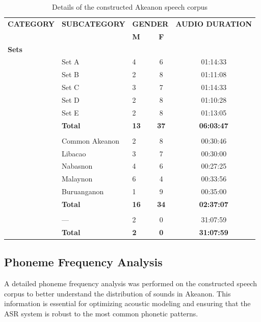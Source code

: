 \begin{table}[H]
	\centering
	\begin{adjustbox}{width=0.95\textwidth}
		\begin{tabular}{lllcc}
			\toprule
			\textbf{CATEGORY} & \textbf{SUBCATEGORY} & \multicolumn{2}{c}{\textbf{GENDER}} & \textbf{AUDIO DURATION} \\
			\cmidrule(lr){3-4}
			& & \textbf{M} & \textbf{F} & \\
			\midrule
			\multicolumn{5}{l}{\textbf{Sets}} \\
			& Set A & 4 & 6 & 01:14:33 \\
			& Set B & 2 & 8 & 01:11:08 \\
			& Set C & 3 & 7 & 01:14:33 \\
			& Set D & 2 & 8 & 01:10:28 \\
			& Set E & 2 & 8 & 01:13:05 \\
			\addlinespace
			& \textbf{Total} & \textbf{13} & \textbf{37} & \textbf{06:03:47} \\
			\addlinespace
			\multicolumn{5}{l}{\textbf{Dialects}} \\
			& Common Akeanon & 2 & 8 & 00:30:46 \\
			& Libacao          & 3 & 7 & 00:30:00 \\
			& Nabasnon         & 4 & 6 & 00:27:25 \\
			& Malaynon         & 6 & 4 & 00:33:56 \\
			& Buruanganon      & 1 & 9 & 00:35:00 \\
			\addlinespace
			& \textbf{Total} & \textbf{16} & \textbf{34} & \textbf{02:37:07} \\
			\addlinespace
			\multicolumn{5}{l}{\textbf{Bible}} \\
			& — & 2 & 0 & 31:07:59 \\
			\addlinespace
			& \textbf{Total} & \textbf{2} & \textbf{0} & \textbf{31:07:59} \\
			\bottomrule
		\end{tabular}
	\end{adjustbox}
	\caption{Details of the constructed Akeanon speech corpus}
	\label{tab:bikolano_stats}
\end{table}

\subsection{Phoneme Frequency Analysis}
A detailed phoneme frequency analysis was performed on the constructed speech corpus to better understand the distribution of sounds in Akeanon. This information is essential for optimizing acoustic modeling and ensuring that the ASR system is robust to the most common phonetic patterns.

